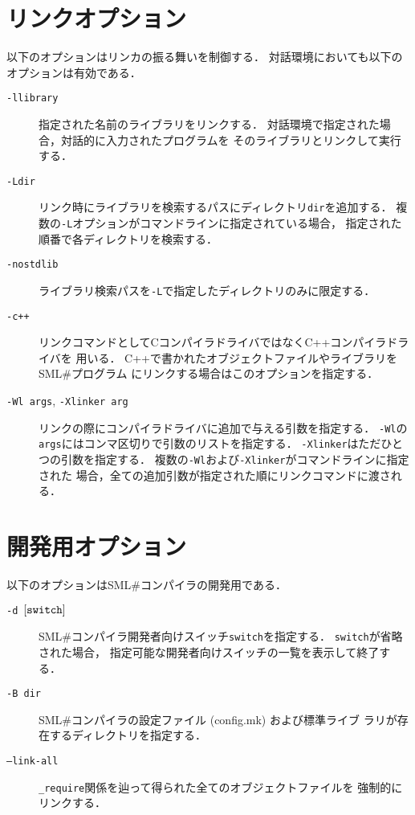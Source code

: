 \documentclass{jbook}
\newcommand{\smlsharp}{SML\#}
\newcommand{\term}[1]{\mbox{{\tt #1}}}
\begin{document}
\section{リンクオプション}

	以下のオプションはリンカの振る舞いを制御する．
	対話環境においても以下のオプションは有効である．

\begin{description}
\item[{\tt -l\term{library}}]
	指定された名前のライブラリをリンクする．
	対話環境で指定された場合，対話的に入力されたプログラムを
そのライブラリとリンクして実行する．

\item[{\tt-L\term{dir}}]
	リンク時にライブラリを検索するパスにディレクトリ\term{dir}を追加する．
	複数の{\tt -L}オプションがコマンドラインに指定されている場合，
指定された順番で各ディレクトリを検索する．

\item[{\tt -nostdlib}]
	ライブラリ検索パスを{\tt -L}で指定したディレクトリのみに限定する．

\item[{\tt -c++}]
	リンクコマンドとしてCコンパイラドライバではなくC++コンパイラドライバを
用いる．
        C++で書かれたオブジェクトファイルやライブラリを\smlsharp{}プログラム
にリンクする場合はこのオプションを指定する．

\item[{\tt -Wl \term{args}},
      {\tt -Xlinker \term{arg}}]
	リンクの際にコンパイラドライバに追加で与える引数を指定する．
	{\tt -Wl}の\term{args}にはコンマ区切りで引数のリストを指定する．
	{\tt -Xlinker}はただひとつの引数を指定する．
	複数の{\tt -Wl}および{\tt -Xlinker}がコマンドラインに指定された
場合，全ての追加引数が指定された順にリンクコマンドに渡される．

\end{description}

\section{開発用オプション}

	以下のオプションは\smlsharp{}コンパイラの開発用である．

\begin{description}
\item[{\tt -d $[\term{switch}]$}]
	\smlsharp{}コンパイラ開発者向けスイッチ\term{switch}を指定する．
	\term{switch}が省略された場合，
指定可能な開発者向けスイッチの一覧を表示して終了する．

\item[{\tt -B \term{dir}}]
	\smlsharp{}コンパイラの設定ファイル (config.mk) および標準ライブ
ラリが存在するディレクトリを指定する．


\item[{\tt --link-all}]
	{\tt \_require}関係を辿って得られた全てのオブジェクトファイルを
強制的にリンクする．

\end{description}
\end{document}
